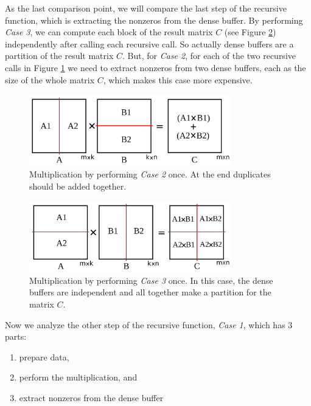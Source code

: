 As the last comparison point, we will compare the last step of the recursive function, which is extracting the nonzeros from the dense buffer.
By performing \textit{Case 3}, we can compute each block of the result matrix $C$ (see Figure \ref{fig:skinny2}) independently after calling each recursive call. So actually dense buffers are a partition of the result matrix $C$. But, for \textit{Case 2}, for each of the two recursive calls in Figure \ref{fig:skinny1} we need to extract nonzeros from two dense buffers, each as the size of the whole matrix $C$, which makes this case more expensive.

\begin{figure}[thb]
    \includegraphics[width=8.8cm,height=3.1cm]{./figures/skinny001.pdf}
    \caption{Multiplication by performing \textit{Case 2} once. At the end duplicates should be added together.}
    \label{fig:skinny1}
\end{figure}

\begin{figure}[thb]
    \includegraphics[width=8.8cm,height=3.1cm]{./figures/skinny002.pdf}
    \caption{Multiplication by performing \textit{Case 3} once. In this case, the dense buffers are independent and all together make a partition for the matrix $C$.}
    \label{fig:skinny2}
\end{figure}

Now we analyze the other step of the recursive function, \textit{Case 1}, which has $3$ parts:
\begin{enumerate}
 \item prepare data,
 \item perform the multiplication, and
 \item extract nonzeros from the dense buffer
\end{enumerate}

